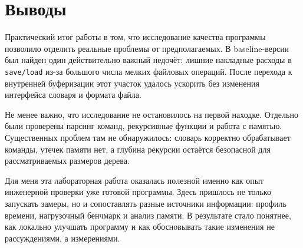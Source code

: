 \section{Выводы}

Практический итог работы в том, что исследование качества программы позволило отделить реальные проблемы от предполагаемых. В baseline-версии был найден один действительно важный недочёт: лишние накладные расходы в \texttt{save/load} из-за большого числа мелких файловых операций. После перехода к внутренней буферизации этот участок удалось ускорить без изменения интерфейса словаря и формата файла.

Не менее важно, что исследование не остановилось на первой находке. Отдельно были проверены парсинг команд, рекурсивные функции и работа с памятью. Существенных проблем там не обнаружилось: словарь корректно обрабатывает команды, утечек памяти нет, а глубина рекурсии остаётся безопасной для рассматриваемых размеров дерева.

Для меня эта лабораторная работа оказалась полезной именно как опыт инженерной проверки уже готовой программы. Здесь пришлось не только запускать замеры, но и сопоставлять разные источники информации: профиль времени, нагрузочный бенчмарк и анализ памяти. В результате стало понятнее, как локально улучшать программу и как обосновывать такие изменения не рассуждениями, а измерениями.
\pagebreak
